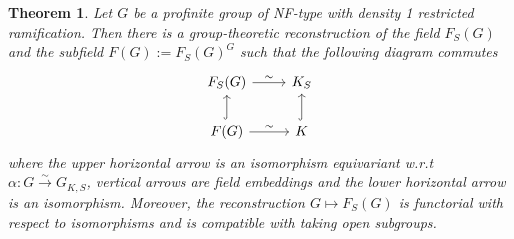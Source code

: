\documentclass{article}
\newtheorem{thm}{Theorem}[section]
\theoremstyle{plain}
\theoremstyle{definition}
\theoremstyle{remark}
\begin{document}
\begin{thm}
Let $G$ be a profinite group of NF-type with density 1 restricted ramification. Then there is a group-theoretic reconstruction of the field $F_S(G)$ and the subfield $F(G) := F_S(G)^G$ such that the following diagram commutes
$$
\begin{tikzcd}
F_S(G) \arrow[r,"\sim"] & K_S \\
F(G) \arrow[u,hookrightarrow] \arrow[r,"\sim"] & K \arrow[u,hookrightarrow]
\end{tikzcd}
$$
where the upper horizontal arrow is an isomorphism equivariant w.r.t $\alpha: G \xrightarrow{\sim} G_{K,S}$, vertical arrows are field embeddings and the lower horizontal arrow is an isomorphism. Moreover, the reconstruction $G \mapsto F_S(G)$ is functorial with respect to isomorphisms and is compatible with taking open subgroups.
\end{thm}
\end{document}
